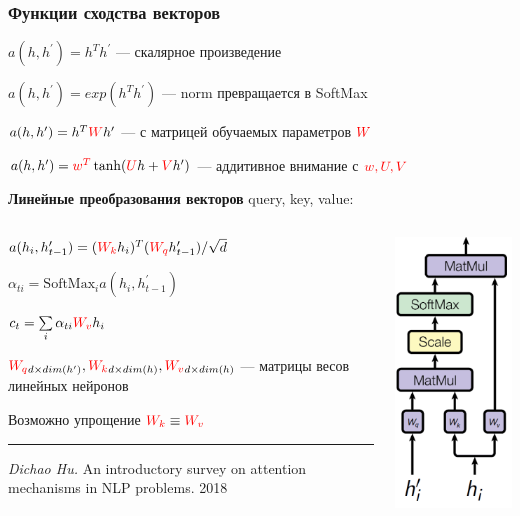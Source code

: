 \documentclass[fullscreen=true, bookmarks=true, hyperref={pdfencoding=unicode}]{beamer}
\begin{document}
\begin{frame}
  \frametitle{Функции сходства векторов}

        $a(h, h^\prime) = h^T h^\prime$ — скалярное произведение

        $a(h, h^\prime) = exp(h^T h^\prime)$ — norm превращается в SoftMax

        $a(h, h^\prime) = h^T {\color{red}W} h^\prime$ — с матрицей обучаемых параметров $\color{red}{W}$

        $a(h, h^\prime) = {\color{red}w^T} \tanh ({\color{red}U}h + {\color{red}V} h^\prime)$ — аддитивное внимание с ${\color{red}w, U, V}$

        \vspace{0.5cm}
        {\bf Линейные преобразования векторов} query, key, value:

    \begin{columns}
      \begin{column}{.6\paperwidth}
        $a(h_i, h^\prime_{t-1}) = ({\color{red}W_k}h_i)^T ({\color{red}W_q}h^\prime_{t-1}) / \sqrt{d}$

        $\alpha_{ti} = \text{SoftMax}_i a(h_i, h^\prime_{t-1})$

        $c_t = \sum\limits_i \alpha_{ti} {\color{red}W_v} h_i $

        ${\color{red}W_q}_{d \times dim(h^\prime)}, {\color{red}W_k}_{d \times dim(h)}, {\color{red}W_v}_{d \times dim(h)}$ — матрицы весов линейных нейронов

        Возможно упрощение ${\color{red}W_k} \equiv {\color{red}W_v}$
        {\footnotesize
        \noindent\rule{8cm}{0.4pt}

        {\it Dichao Hu.} An introductory survey on attention mechanisms in NLP problems. 2018}
      \end{column}
      \begin{column}{.18\paperwidth}
        \includegraphics[keepaspectratio,
                       width=.15\paperwidth]{general_attention.png}
      \end{column}
  \end{columns}

\end{frame}
\end{document}
